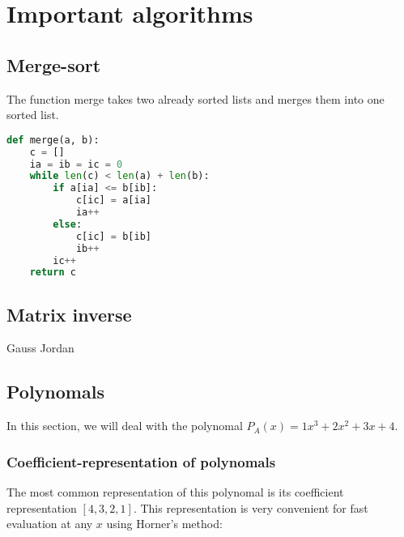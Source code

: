 \section{Important algorithms}

\subsection{Merge-sort}

The function merge takes two already sorted lists and merges them into one sorted list.

\begin{lstlisting}[language=python]
def merge(a, b):
    c = []
    ia = ib = ic = 0
    while len(c) < len(a) + len(b):
        if a[ia] <= b[ib]:
            c[ic] = a[ia]
            ia++
        else:
            c[ic] = b[ib]
            ib++
        ic++
    return c
\end{lstlisting}



\subsection{Matrix inverse}
Gauss Jordan

\subsection{Polynomals}

In this section, we will deal with the polynomal $P_A(x) = 1x^3 + 2x^2 + 3x + 4$.

\subsubsection{Coefficient-representation of polynomals}
The most common representation of this polynomal is its coefficient representation $[4, 3, 2, 1]$. This representation is very convenient for fast evaluation at any $x$ using Horner's method: 

